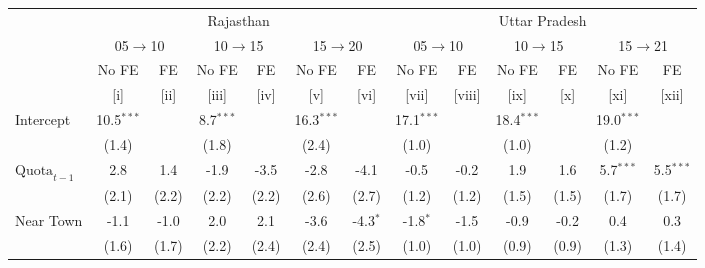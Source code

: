 
\begingroup
\centering
\scriptsize
\begin{adjustbox}{max width=\linewidth}
   \begin{threeparttable}[b]
      \begin{tabular}{lcccccccccccc}
         \toprule
          & \multicolumn{6}{c}{Rajasthan} & \multicolumn{6}{c}{Uttar Pradesh} \\
          & \multicolumn{2}{c}{05$\rightarrow$10} & \multicolumn{2}{c}{10$\rightarrow$15} & \multicolumn{2}{c}{15$\rightarrow$20} & \multicolumn{2}{c}{05$\rightarrow$10} & \multicolumn{2}{c}{10$\rightarrow$15} & \multicolumn{2}{c}{15$\rightarrow$21} \\
                                                        & No FE        & FE    & No FE       & FE    & No FE        & FE          & No FE        & FE         & No FE        & FE    & No FE        & FE \\
                                                        & [i]          & [ii]  & [iii]       & [iv]  & [v]          & [vi]        & [vii]        & [viii]     & [ix]         & [x]   & [xi]         & [xii]\\
         \midrule
         Intercept                                      & 10.5$^{***}$ &       & 8.7$^{***}$ &       & 16.3$^{***}$ &             & 17.1$^{***}$ &            & 18.4$^{***}$ &       & 19.0$^{***}$ &   \\
                                                        & (1.4)        &       & (1.8)       &       & (2.4)        &             & (1.0)        &            & (1.0)        &       & (1.2)        &   \\
         $\text{Quota}_{t-1}$                           & 2.8          & 1.4   & -1.9        & -3.5  & -2.8         & -4.1        & -0.5         & -0.2       & 1.9          & 1.6   & 5.7$^{***}$  & 5.5$^{***}$\\
                                                        & (2.1)        & (2.2) & (2.2)       & (2.2) & (2.6)        & (2.7)       & (1.2)        & (1.2)      & (1.5)        & (1.5) & (1.7)        & (1.7)\\
         Near Town                                      & -1.1         & -1.0  & 2.0         & 2.1   & -3.6         & -4.3$^{*}$  & -1.8$^{*}$   & -1.5       & -0.9         & -0.2  & 0.4          & 0.3\\
                                                        & (1.6)        & (1.7) & (2.2)       & (2.4) & (2.4)        & (2.5)       & (1.0)        & (1.0)      & (0.9)        & (0.9) & (1.3)        & (1.4)\\

\end{tabular}
\end{threeparttable}
\end{adjustbox}
